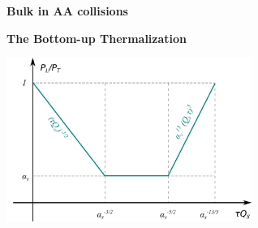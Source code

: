\documentclass[9pt,a4paper,unknownkeysallowed,xcolor=dvipsnames,aspectratio=43]{beamer}
\begin{document}
\setcounter{page}{0}
\begin{frame}
\vspace*{\fill}
\begin{center}
{\Huge\bf\color{gray} Bulk in AA collisions}
\end{center}
\vspace*{\fill}
\end{frame}
%
%
\setcounter{page}{7}
\begin{frame}{\bf\huge The Bottom-up Thermalization}	\vspace{2mm}
\begin{center}
\includegraphics[width=0.6\textwidth]{fig/PLoPT}\\
\vspace{4mm}

\end{center}
\end{frame}
\end{document}

